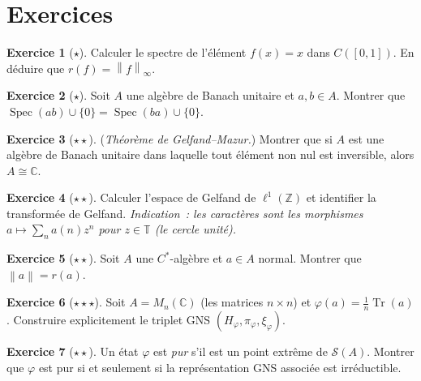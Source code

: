 \documentclass[a4paper,12pt]{book}
\DeclareMathOperator{\Spec}{Spec}
\DeclareMathOperator{\Tr}{Tr}
\newcommand{\Z}{\mathbb{Z}}
\newcommand{\C}{\mathbb{C}}
\newcommand{\norm}[1]{\left\| #1 \right\|}
\theoremstyle{definition}
\newtheorem{exercice}{Exercice}[chapter]
\theoremstyle{plain}
\theoremstyle{remark}
\begin{document}
\section{Exercices}

\begin{exercice}[$\star$]
Calculer le spectre de l'élément $f(x) = x$ dans $C([0,1])$. En déduire que
$r(f) = \norm{f}_\infty$.
\end{exercice}

\begin{exercice}[$\star$]
Soit $A$ une algèbre de Banach unitaire et $a, b \in A$. Montrer que
$\Spec(ab) \cup \{0\} = \Spec(ba) \cup \{0\}$.
\end{exercice}

\begin{exercice}[$\star\star$]
(\emph{Théorème de Gelfand--Mazur.}) Montrer que si $A$ est une algèbre de Banach unitaire
dans laquelle tout élément non nul est inversible, alors $A \cong \C$.
\end{exercice}

\begin{exercice}[$\star\star$]
Calculer l'espace de Gelfand de $\ell^1(\Z)$ et identifier la transformée de Gelfand.
\emph{Indication~: les caractères sont les morphismes $a \mapsto \sum_n a(n) z^n$ pour
$z \in \mathbb{T}$ (le cercle unité).}
\end{exercice}

\begin{exercice}[$\star\star$]
Soit $A$ une $C^*$-algèbre et $a \in A$ normal. Montrer que
$\norm{a} = r(a)$.
\end{exercice}

\begin{exercice}[$\star\star\star$]
Soit $A = M_n(\C)$ (les matrices $n \times n$) et $\varphi(a) = \frac{1}{n}\Tr(a)$.
Construire explicitement le triplet GNS $(H_\varphi, \pi_\varphi, \xi_\varphi)$.
\end{exercice}

\begin{exercice}[$\star\star$]
Un état $\varphi$ est \emph{pur} s'il est un point extrême de $\mathcal{S}(A)$. Montrer
que $\varphi$ est pur si et seulement si la représentation GNS associée est irréductible.
\end{exercice}
\end{document}
